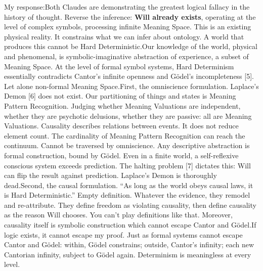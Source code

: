 \documentclass[11pt]{article}
\renewcommand{\\}[1][\mynewlineskip]{\oldnewline[#1]}
\begin{document}
\vspace{1em}
My response:\\
Both Claudes are demonstrating the greatest logical fallacy in the history of thought. Reverse the inference: \textbf{Will already exists}, operating at the level of complex symbols, processing infinite Meaning Space. This is an existing physical reality. It constrains what we can infer about ontology. A world that produces this cannot be Hard Deterministic.\\
Our knowledge of the world, physical and phenomenal, is symbolic-imaginative abstraction of experience, a subset of Meaning Space. At the level of formal symbol systems, Hard Determinism essentially contradicts Cantor's infinite openness and Gödel's incompleteness [5]. Let alone non-formal Meaning Space.\\
First, the omniscience formulation. Laplace's Demon [6] does not exist. Our partitioning of things and states is Meaning Pattern Recognition. Judging whether Meaning Valuations are independent, whether they are psychotic delusions, whether they are passive: all are Meaning Valuations. Causality describes relations between events. It does not reduce element count. The cardinality of Meaning Pattern Recognition can reach the continuum. Cannot be traversed by omniscience. Any descriptive abstraction is formal construction, bound by Gödel. Even in a finite world, a self-reflexive conscious system exceeds prediction. The halting problem [7] dictates this: Will can flip the result against prediction. Laplace's Demon is thoroughly dead.\\
Second, the causal formulation. ``As long as the world obeys causal laws, it is Hard Deterministic.'' Empty definition. Whatever the evidence, they remodel and re-attribute. They define freedom as violating causality, then define causality as the reason Will chooses. You can't play definitions like that. Moreover, causality itself is symbolic construction which cannot escape Cantor and Gödel.\\
If logic exists, it cannot escape my proof. Just as formal systems cannot escape Cantor and Gödel: within, Gödel constrains; outside, Cantor's infinity; each new Cantorian infinity, subject to Gödel again. Determinism is meaningless at every level.
\end{document}
